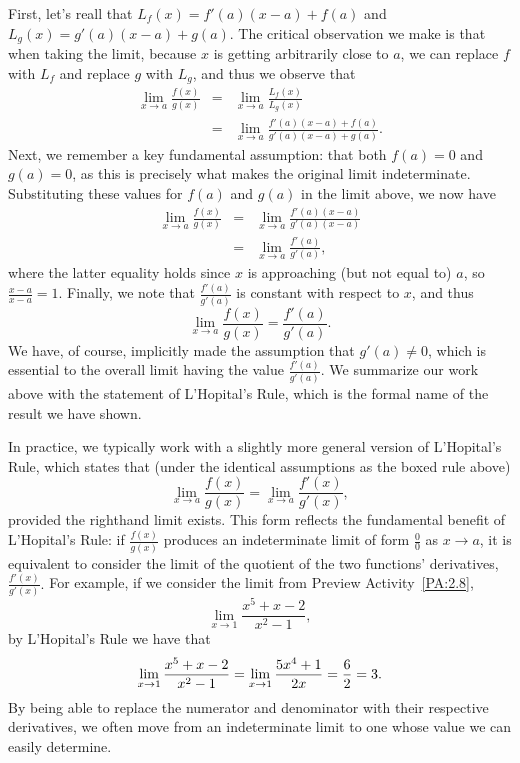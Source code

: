 First, let's reall that $L_f(x) = f'(a)(x-a) + f(a)$ and $L_g(x) = g'(a)(x-a) +g(a)$.  The critical observation we make is that when taking the limit, because $x$ is getting arbitrarily close to $a$, we can replace $f$ with $L_f$ and replace $g$ with $L_g$, and thus we observe that
\begin{eqnarray*}
	\lim_{x \to a} \frac{f(x)}{g(x)} & = & \lim_{x \to a} \frac{L_f(x)}{L_g(x)} \\
						& = & \lim_{x \to a} \frac{f'(a)(x-a) + f(a)}{g'(a)(x-a) + g(a)}.
\end{eqnarray*}
Next, we remember a key fundamental assumption: that both $f(a) = 0$ and $g(a) = 0$, as this is precisely what makes the original limit indeterminate.  Substituting these values for $f(a)$ and $g(a)$ in the limit above, we now have
\begin{eqnarray*}
\lim_{x \to a} \frac{f(x)}{g(x)} & = & \lim_{x \to a} \frac{f'(a)(x-a)}{g'(a)(x-a)} \\
					& = & \lim_{x \to a} \frac{f'(a)}{g'(a)},
\end{eqnarray*}
where the latter equality holds since $x$ is approaching (but not equal to) $a$, so $\frac{x-a}{x-a} = 1$. 
Finally, we note that $\frac{f'(a)}{g'(a)}$ is constant with respect to $x$, and thus
$$\lim_{x \to a} \frac{f(x)}{g(x)} = \frac{f'(a)}{g'(a)}.$$
We have, of course, implicitly made the assumption that $g'(a) \ne 0$, which is essential to the overall limit having the value $\frac{f'(a)}{g'(a)}$.  We summarize our work above with the statement of L'Hopital's Rule, which is the formal name of the result we have shown.

\vspace*{5pt}
\nin {}
\vspace*{1pt}

In practice, we typically work with a slightly more general version of L'Hopital's Rule, which states that (under the identical assumptions as the boxed rule above) 
$$\lim_{x \to a} \frac{f(x)}{g(x)} = \lim_{x \to a} \frac{f'(x)}{g'(x)},$$
provided the righthand limit exists.  This form reflects the fundamental benefit of L'Hopital's Rule:  if $\frac{f(x)}{g(x)}$ produces an indeterminate limit of form $\frac{0}{0}$ as $x \to a$, it is equivalent to consider the limit of the quotient of the two functions' derivatives, $\frac{f'(x)}{g'(x)}.$  For example, if we consider the limit from Preview Activity~\ref{PA:2.8},
$$\lim_{x \to 1} \frac{x^5 + x - 2}{x^2 - 1},$$
by L'Hopital's Rule we have that
$$
\lim_{x \to 1} \frac{x^5 + x - 2}{x^2 - 1} = \lim_{x \to 1} \frac{5x^4 + 1}{2x} = \frac{6}{2} = 3. \\
$$
By being able to replace the numerator and denominator with their respective derivatives, we often move from an indeterminate limit to one whose value we can easily determine.  

